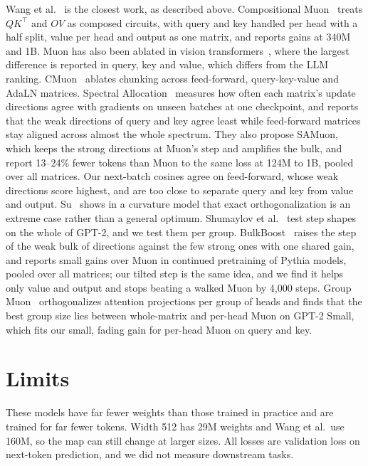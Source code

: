 \documentclass[11pt]{article}
\begin{document}
Wang et al.~\cite{wang2025tail} is the closest work, as described above. Compositional Muon~\cite{compositional} treats $QK^\top$ and $OV$ as composed circuits, with query and key handled per head with a half split, value per head and output as one matrix, and reports gains at 340M and 1B. Muon has also been ablated in vision transformers~\cite{muonvit}, where the largest difference is reported in query, key and value, which differs from the LLM ranking. CMuon~\cite{cmuon} ablates chunking across feed-forward, query-key-value and AdaLN matrices. Spectral Allocation~\cite{spectral} measures how often each matrix's update directions agree with gradients on unseen batches at one checkpoint, and reports that the weak directions of query and key agree least while feed-forward matrices stay aligned across almost the whole spectrum. They also propose SAMuon, which keeps the strong directions at Muon's step and amplifies the bulk, and report 13--24\% fewer tokens than Muon to the same loss at 124M to 1B, pooled over all matrices. Our next-batch cosines agree on feed-forward, whose weak directions score highest, and are too close to separate query and key from value and output. Su~\cite{su} shows in a curvature model that exact orthogonalization is an extreme case rather than a general optimum. Shumaylov et al.~\cite{shumaylov} test step shapes on the whole of GPT-2, and we test them per group. BulkBoost~\cite{bulkboost} raises the step of the weak bulk of directions against the few strong ones with one shared gain, and reports small gains over Muon in continued pretraining of Pythia models, pooled over all matrices; our tilted step is the same idea, and we find it helps only value and output and stops beating a walked Muon by 4,000 steps. Group Muon~\cite{groupmuon} orthogonalizes attention projections per group of heads and finds that the best group size lies between whole-matrix and per-head Muon on GPT-2 Small, which fits our small, fading gain for per-head Muon on query and key.

\section{Limits}

These models have far fewer weights than those trained in practice and are trained for far fewer tokens. Width 512 has 29M weights and Wang et al.\ use 160M, so the map can still change at larger sizes. All losses are validation loss on next-token prediction, and we did not measure downstream tasks.
\end{document}
